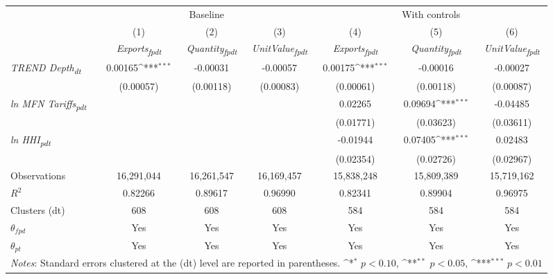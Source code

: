 {
\def\sym#1{\ifmmode^{#1}\else\(^{#1}\)\fi}
\begin{tabular}{l*{6}{c}}
\toprule
&\multicolumn{3}{c}{Baseline}&\multicolumn{3}{c}{With controls}\\\cmidrule(lr){2-4}\cmidrule(lr){5-7}
&(1)&(2)&(3)&(4)&(5)&(6)\\
&\textit{Exports\textsubscript{fpdt}}&\textit{Quantity\textsubscript{fpdt}}&\textit{UnitValue\textsubscript{fpdt}}&\textit{Exports\textsubscript{fpdt}}&\textit{Quantity\textsubscript{fpdt}}&\textit{UnitValue\textsubscript{fpdt}}\\
\midrule
\textit{TREND Depth\textsubscript{dt}} & 0.00165\sym{***} & -0.00031 & -0.00057 & 0.00175\sym{***} & -0.00016 & -0.00027\\
 & (0.00057) & (0.00118) & (0.00083) & (0.00061) & (0.00118) & (0.00087)\\
\addlinespace
\textit{ln MFN Tariffs\textsubscript{pdt}} &  &  &  & 0.02265 & 0.09694\sym{***} & -0.04485\\
 &  &  &  & (0.01771) & (0.03623) & (0.03611)\\
\addlinespace
\textit{ln HHI\textsubscript{pdt}} &  &  &  & -0.01944 & 0.07405\sym{***} & 0.02483\\
 &  &  &  & (0.02354) & (0.02726) & (0.02967)\\
\midrule
Observations & 16,291,044 & 16,261,547 & 16,169,457 & 15,838,248 & 15,809,389 & 15,719,162\\
$R^{2}$ & 0.82266 & 0.89617 & 0.96990 & 0.82341 & 0.89904 & 0.96975\\
Clusters (dt) & 608 & 608 & 608 & 584 & 584 & 584\\
$\theta_{fpd}$ & Yes & Yes & Yes & Yes & Yes & Yes\\
$\theta_{pt}$ & Yes & Yes & Yes & Yes & Yes & Yes\\
\bottomrule
\multicolumn{7}{l}{\footnotesize \textit{Notes}: Standard errors clustered at the (dt) level are reported in parentheses. \sym{*} \(p<0.10\), \sym{**} \(p<0.05\), \sym{***} \(p<0.01\)}\\
\end{tabular}
}
